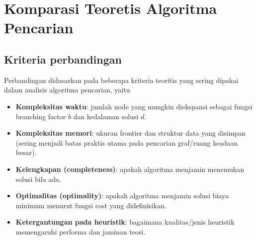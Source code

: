 \section{Komparasi Teoretis Algoritma Pencarian}

\subsection{Kriteria perbandingan}
Perbandingan didasarkan pada beberapa kriteria teoritis yang sering dipakai dalam analisis algoritma pencarian, yaitu
\begin{itemize}
    \item \textbf{Kompleksitas waktu}: jumlah node yang mungkin diekspansi sebagai fungsi branching factor $b$ dan kedalaman solusi $d$.
    \item \textbf{Kompleksitas memori}: ukuran frontier dan struktur data yang disimpan (sering menjadi batas praktis utama pada pencarian graf/ruang keadaan besar).
    \item \textbf{Kelengkapan (completeness)}: apakah algoritma menjamin menemukan solusi bila ada.
    \item \textbf{Optimalitas (optimality)}: apakah algoritma menjamin solusi biaya minimum menurut fungsi cost yang didefinisikan.
    \item \textbf{Ketergantungan pada heuristik}: bagaimana kualitas/jenis heuristik memengaruhi performa dan jaminan teori.
\end{itemize}

